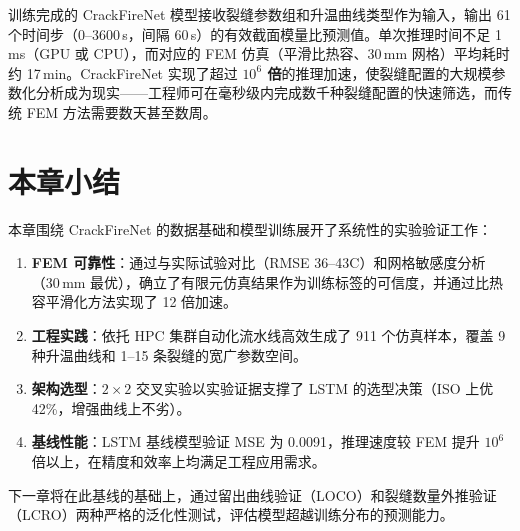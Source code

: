 训练完成的 CrackFireNet 模型接收裂缝参数组和升温曲线类型作为输入，输出 61 个时间步（0--3600\,s，间隔 60\,s）的有效截面模量比预测值。单次推理时间不足 1\,ms（GPU 或 CPU），而对应的 FEM 仿真（平滑比热容、30\,mm 网格）平均耗时约 17\,min。CrackFireNet 实现了超过 \textbf{$10^6$ 倍}的推理加速，使裂缝配置的大规模参数化分析成为现实——工程师可在毫秒级内完成数千种裂缝配置的快速筛选，而传统 FEM 方法需要数天甚至数周。

\section{本章小结}

本章围绕 CrackFireNet 的数据基础和模型训练展开了系统性的实验验证工作：

\begin{enumerate}
    \item \textbf{FEM 可靠性}：通过与实际试验对比（RMSE 36--43\textdegree C）和网格敏感度分析（30\,mm 最优），确立了有限元仿真结果作为训练标签的可信度，并通过比热容平滑化方法实现了 12 倍加速。
    \item \textbf{工程实践}：依托 HPC 集群自动化流水线高效生成了 911 个仿真样本，覆盖 9 种升温曲线和 1--15 条裂缝的宽广参数空间。
    \item \textbf{架构选型}：$2 \times 2$ 交叉实验以实验证据支撑了 LSTM 的选型决策（ISO 上优 42\%，增强曲线上不劣）。
    \item \textbf{基线性能}：LSTM 基线模型验证 MSE 为 0.0091，推理速度较 FEM 提升 $10^6$ 倍以上，在精度和效率上均满足工程应用需求。
\end{enumerate}

下一章将在此基线的基础上，通过留出曲线验证（LOCO）和裂缝数量外推验证（LCRO）两种严格的泛化性测试，评估模型超越训练分布的预测能力。
